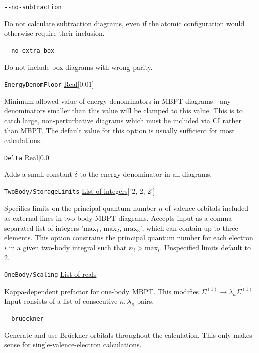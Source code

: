 \documentclass{report}
\begin{document}
\texttt{{-}{-}no-subtraction}
\begin{adjustwidth}{1cm}{}
Do not calculate subtraction diagrams, even if the atomic configuration would otherwise require their
inclusion.
\end{adjustwidth}

\texttt{{-}{-}no-extra-box}
\begin{adjustwidth}{1cm}{}
Do not include box-diagrams with wrong parity.
\end{adjustwidth}

\texttt{EnergyDenomFloor} \uline{Real}[0.01]
\begin{adjustwidth}{1cm}{}
Minimum allowed value of energy denominators in MBPT diagrams - any denominators smaller than this value
will be clamped to this value. This is to catch large, non-perturbative diagrams which must be
included via CI rather than MBPT. The default value for this option is usually sufficient for most 
calculations.
\end{adjustwidth}

\texttt{Delta} \uline{Real}[0.0]
\begin{adjustwidth}{1cm}{}
Adds a small constant $\delta$ to the energy denominator in all diagrams.
\end{adjustwidth}

\texttt{TwoBody/StorageLimits} \uline{List of integers}['2, 2, 2']
\begin{adjustwidth}{1cm}{}
Specifies limits on the principal quantum number $n$ of
valence orbitals included as external lines in two-body MBPT diagrams. Accepts input as a 
comma-separated list of integers '$\mathrm{max}_1$, $\mathrm{max}_2$, $\mathrm{max}_3$', which can 
contain up to three elements. This option constrains the principal quantum number for each electron $i$ 
in a given two-body integral such that $n_i > \mathrm{max}_i$. Unspecified limits default to 2.
\end{adjustwidth}

\texttt{OneBody/Scaling} \uline{List of reals}
\begin{adjustwidth}{1cm}{}
Kappa-dependent prefactor for one-body MBPT. This modifies $\Sigma^{(1)} \to \lambda_{\kappa}
\Sigma^{(1)}$. Input consists of a list of consecutive $\kappa, \lambda_{\kappa}$ pairs.
\end{adjustwidth}

\texttt{{-}{-}brueckner}
\begin{adjustwidth}{1cm}{}
Generate and use Br\"{u}ckner orbitals throughout the calculation. This only makes sense for
single-valence-electron calculations.
\end{adjustwidth}
\end{document}
